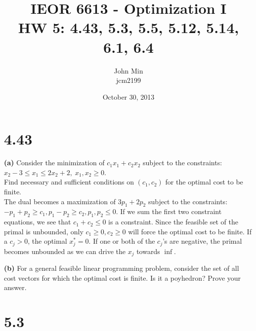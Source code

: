 \documentclass{article}
\begin{document}
\title{IEOR 6613 - Optimization I\\ HW 5:  4.43, 5.3, 5.5, 5.12, 5.14, 6.1, 6.4}

\author{John Min\\ jcm2199}
\date{October 30, 2013}
\maketitle

\section*{4.43}

\textbf{(a)}  Consider the minimization of $c_1 x_1 + c_2 x_2$ subject to the constraints:
$x_2 - 3 \leq x_1 \leq 2 x_2 +2, \; x_1, x_2 \geq 0$. \\
\noindent 
Find necessary and sufficient conditions on $(c_1, c_2)$ for the optimal cost to be finite.\\

\noindent
The dual becomes a maximization of $3 p_1 + 2 p_2$ subject to the constraints: $- p_1 + p_2 \geq c_1, p_1 - p_2 \geq c_2, p_1, p_2 \leq 0$.  If we sum the first two constraint equations, we see that $c_1 + c_2 \leq 0$ is a constraint.  Since the feasible set of the primal is unbounded, only $c_1 \geq 0, c_2 \geq 0$ will force the optimal cost to be finite.  If a $c_j > 0$, the optimal $x^*_j = 0$.  If one or both of the $c_j$'s are negative, the primal becomes unbounded as we can drive the $x_j$ towards $\inf$. \\
\noindent


\noindent
\textbf{(b)}
For a general feasible linear programming problem, consider the set of all cost vectors for which the optimal cost is finite.  Is it a poyhedron?  Prove your answer. \\




\section*{5.3}
\end{document}
